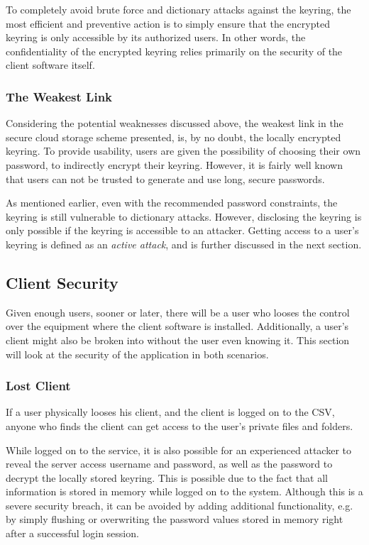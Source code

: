 \documentclass[pdftex,english,10pt,b5paper,twoside]{book}
\begin{document}
To completely avoid brute force and dictionary attacks against the keyring, the
most efficient and preventive action is to simply ensure that the encrypted
keyring is only accessible by its authorized users. In other words, the
confidentiality of the encrypted keyring relies primarily on the security of
the client software itself.

\subsubsection{The Weakest Link}

Considering the potential weaknesses discussed above, the weakest link in the
secure cloud storage scheme presented, is, by no doubt, the locally encrypted
keyring. To provide usability, users are given the possibility of choosing
their own password, to indirectly encrypt their keyring. However, it is fairly
well known that users can not be trusted to generate and use long, secure
passwords.

As mentioned earlier, even with the recommended password constraints, the
keyring is still vulnerable to dictionary attacks. However, disclosing the
keyring is only possible if the keyring is accessible to an attacker. Getting
access to a user's keyring is defined as an \emph{active attack}, and is
further discussed in the next section.

\subsection{Client Security}

Given enough users, sooner or later, there will be a user who looses the
control over the equipment where the client software is installed.
Additionally, a user's client might also be broken into without the user even
knowing it. This section will look at the security of the application in both
scenarios.

\subsubsection{Lost Client}

If a user physically looses his client, and the client is logged on to the
\acl{CSV}, anyone who finds the client can get access to the user's
private files and folders. 

While logged on to the service, it is also possible for an experienced attacker
to reveal the server access username and password, as well as the password to
decrypt the locally stored keyring. This is possible due to the fact that all
information is stored in memory while logged on to the system. Although this is
a severe security breach, it can be avoided by adding additional functionality,
e.g. by simply flushing or overwriting the password values stored in memory
right after a successful login session.
\end{document}
